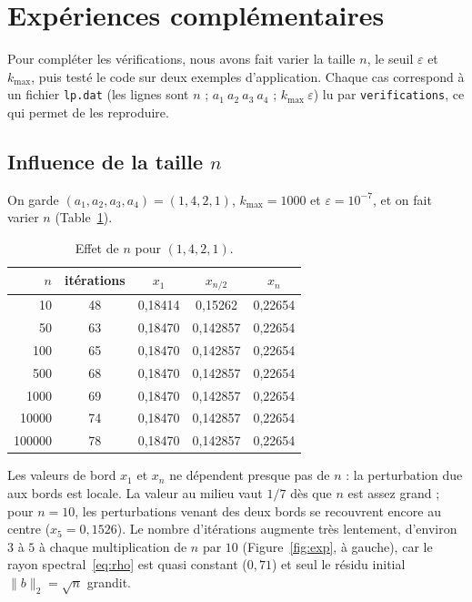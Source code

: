 \documentclass[a4paper]{scrartcl}
\begin{document}
\section{Expériences complémentaires}

Pour compléter les vérifications, nous avons fait varier la taille $n$, le seuil $\varepsilon$ et $k_{\max}$, 
puis testé le code sur deux exemples d'application. Chaque cas correspond à un fichier \lstinline{lp.dat} 
(les lignes sont $n$ ; $a_1\ a_2\ a_3\ a_4$ ; $k_{\max}\ \varepsilon$) lu par \lstinline{verifications}, ce qui permet de les reproduire.

\subsection{Influence de la taille $n$}

On garde $(a_1,a_2,a_3,a_4)=(1,4,2,1)$, $k_{\max}=1000$ et $\varepsilon=10^{-7}$, et on fait varier $n$ (Table~\ref{tbl:varn}).
\begin{table}[!ht]
\centering
\begin{tabular}{|r|c|c|c|c|}
\hline
$n$ & itérations & $x_1$ & $x_{n/2}$ & $x_n$ \\ \hline
10 & 48 & 0,18414 & 0,15262 & 0,22654 \\ \hline
50 & 63 & 0,18470 & 0,142857 & 0,22654 \\ \hline
100 & 65 & 0,18470 & 0,142857 & 0,22654 \\ \hline
500 & 68 & 0,18470 & 0,142857 & 0,22654 \\ \hline
1000 & 69 & 0,18470 & 0,142857 & 0,22654 \\ \hline
10000 & 74 & 0,18470 & 0,142857 & 0,22654 \\ \hline
100000 & 78 & 0,18470 & 0,142857 & 0,22654 \\ \hline
\end{tabular}
\caption{Effet de $n$ pour $(1,4,2,1)$.}
\label{tbl:varn}
\end{table}
Les valeurs de bord $x_1$ et $x_n$ ne dépendent presque pas de $n$ : la perturbation due aux bords est locale. 
La valeur au milieu vaut $1/7$ dès que $n$ est assez grand ; pour $n=10$, les perturbations venant des deux bords 
se recouvrent encore au centre ($x_5=0{,}1526$). Le nombre d'itérations augmente très lentement, d'environ $3$ à $5$ à 
chaque multiplication de $n$ par $10$ (Figure~\ref{fig:exp}, à gauche), car le rayon spectral~\eqref{eq:rho} est quasi 
constant ($0{,}71$) et seul le résidu initial $\|b\|_2=\sqrt n$ grandit.
\end{document}
